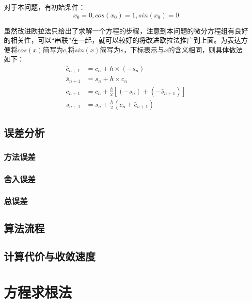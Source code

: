 \documentclass[UTF8]{ctexart}
\begin{document}
对于本问题，有初始条件：
\begin{equation}
    x_0=0,cos(x_0)=1,sin(x_0)=0
\end{equation}

虽然改进欧拉法只给出了求解一个方程的步骤，注意到本问题的微分方程组有良好的相关性，可以“串联”在一起，就可以较好的将改进欧拉法推广到上面。为表达方便将$cos(x)$简写为$c$,将$sin(x)$简写为$s$，下标表示与$x$的含义相同，则具体做法如下：
\begin{equation}
    \begin{aligned}
        \bar{c}_{n+1} &= c_n + h\times(-s_n)\\
        \bar{s}_{n+1} &= s_n + h\times c_n\\
        c_{n+1} &= c_n + \frac{h}{2}[(-s_n)+(-\bar{s}_{n+1})]\\
        s_{n+1} &= s_n + \frac{h}{2}(c_n+\bar{c}_{n+1})
    \end{aligned}
\end{equation}

\subsection{误差分析}

\subsubsection{方法误差}


\subsubsection{舍入误差}

\subsubsection{总误差}

\subsection{算法流程}

\subsection{计算代价与收敛速度}

\section{方程求根法}
\end{document}
